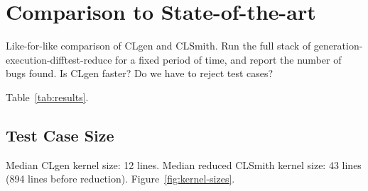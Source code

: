 \section{Comparison to State-of-the-art}

Like-for-like comparison of CLgen and CLSmith. Run the full stack of generation-execution-difftest-reduce for a fixed period of time, and report the number of bugs found. Is CLgen faster? Do we have to reject test cases?

Table~\ref{tab:results}.



\subsection{Test Case Size}

Median CLgen kernel size: 12 lines. Median reduced CLSmith kernel size: 43 lines (894 lines before reduction). Figure~\ref{fig:kernel-sizes}.

